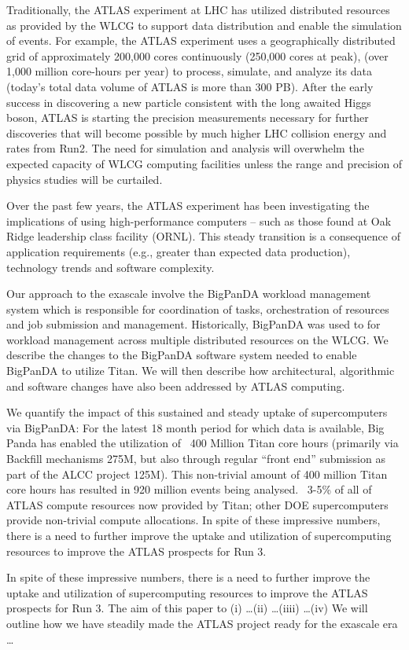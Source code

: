 

Traditionally, the ATLAS experiment at LHC has utilized distributed resources
as provided by the WLCG to support data distribution and enable the simulation
of events.  For example, the ATLAS experiment uses a geographically distributed
grid of approximately 200,000 cores continuously (250,000 cores at peak), (over
1,000 million core-hours per year) to process, simulate, and analyze its data
(today's total data volume of ATLAS is more than 300 PB). After the early
success in discovering a new particle consistent with the long awaited Higgs
boson, ATLAS is starting the precision measurements necessary for further
discoveries that will become possible by much higher LHC collision energy and
rates from Run2. The need for simulation and analysis will overwhelm the
expected capacity of WLCG computing facilities unless the range and precision
of physics studies will be curtailed.

Over the past few years, the ATLAS experiment has been investigating the
implications of using high-performance computers -- such as those found at Oak
Ridge leadership class facility (ORNL). This steady transition is a consequence
of application requirements (e.g., greater than expected data production),
technology trends and software complexity.

Our approach to the exascale involve the BigPanDA workload management system
which is responsible for coordination of tasks, orchestration of resources and
job submission and management. Historically, BigPanDA was used to for workload
management across multiple distributed resources on the WLCG. We describe the
changes to the BigPanDA software system needed to enable BigPanDA to utilize
Titan. We will then describe how architectural, algorithmic and software
changes have also been addressed by ATLAS computing.

We quantify the impact of this sustained and steady uptake of supercomputers
via BigPanDA: For the latest 18 month period for which data is available, Big
Panda has enabled the utilization of ~400 Million Titan core hours (primarily
via Backfill mechanisms 275M, but also through regular ``front end'' submission
as part of the ALCC project 125M). This non-trivial amount of 400 million Titan
core hours has resulted in 920 million events being analysed. ~3-5\% of all of
ATLAS compute resources now provided by Titan; other DOE supercomputers provide
non-trivial compute allocations. In spite of these impressive numbers, there is
a need to further improve the uptake and utilization of supercomputing
resources to improve the ATLAS prospects for Run 3. 

In spite of these impressive numbers, there is a need to further improve the
uptake and utilization of supercomputing resources to improve the ATLAS
prospects for Run 3. The aim of this paper to (i) \ldots (ii) \ldots (iiii)
\ldots (iv) We will outline how we have steadily made the ATLAS project ready
for the exascale era \ldots 

